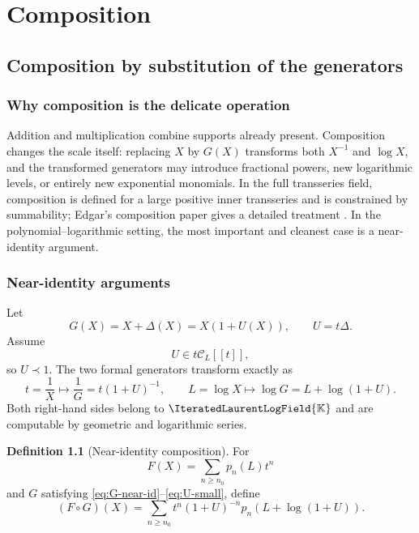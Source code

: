 \documentclass[11pt,oneside]{book}
\theoremstyle{definition}
\newtheorem{definition}[theorem]{Definition}
\theoremstyle{remark}
\newcommand{\K}{\mathbb K}
\newcommand{\PLfield}{\IteratedLaurentLogField{\K}}
\newcommand{\precdom}{\prec}
\newcommand{\compose}{\mathbin{\circ}}
\begin{document}
\part{Composition}

\chapter{Composition by substitution of the generators}
\label{ch:composition-generators}

\section{Why composition is the delicate operation}
Addition and multiplication combine supports already present.  Composition
changes the scale itself: replacing $X$ by $G(X)$ transforms both
$X^{-1}$ and $\log X$, and the transformed generators may introduce
fractional powers, new logarithmic levels, or entirely new exponential
monomials.  In the full transseries field, composition is defined for a large
positive inner transseries and is constrained by summability; Edgar's
composition paper gives a detailed treatment \cite{EdgarComposition}.  In the
polynomial--logarithmic setting, the most important and cleanest case is a
near-identity argument.

\section{Near-identity arguments}
Let
\begin{equation}\label{eq:G-near-id}
 G(X)=X+\Delta(X)=X(1+U(X)),
 \qquad U=t\Delta.
\end{equation}
Assume
\begin{equation}\label{eq:U-small}
 U\in t\mathcal C_L[[t]],
\end{equation}
so $U\precdom1$.  The two formal generators transform exactly as
\begin{equation}\label{eq:generator-substitution}
 t=\frac1X\longmapsto
 \frac1G=t(1+U)^{-1},
 \qquad
 L=\log X\longmapsto
 \log G=L+\log(1+U).
\end{equation}
Both right-hand sides belong to $\PLfield$ and are computable by geometric
and logarithmic series.

\begin{definition}[Near-identity composition]
For
\[
 F(X)=\sum_{n\ge n_0}p_n(L)t^n
\]
and $G$ satisfying \eqref{eq:G-near-id}--\eqref{eq:U-small}, define
\begin{equation}\label{eq:composition-generator-formula}
 (F\compose G)(X)
 =\sum_{n\ge n_0}
 t^n(1+U)^{-n}
 p_n\!\left(L+\log(1+U)\right).
\end{equation}
\end{definition}
\end{document}
